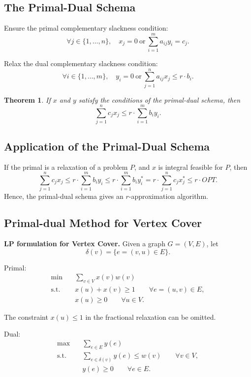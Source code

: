 \documentclass[12pt,a4paper]{report}
\newtheorem{theorem}{Theorem}
\begin{document}
\subsection{The Primal-Dual Schema}

Ensure the primal complementary slackness condition:
\[
\forall j \in \{1,\dots,n\}, \quad x_j = 0 \ \text{or} \ \sum_{i=1}^m a_{ij}y_i = c_j.
\]

Relax the dual complementary slackness condition:
\[
\forall i \in \{1,\dots,m\}, \quad y_i = 0 \ \text{or} \ \sum_{j=1}^n a_{ij}x_j \le r \cdot b_i.
\]

\begin{theorem}
If $x$ and $y$ satisfy the conditions of the primal-dual schema, then
\[
\sum_{j=1}^n c_j x_j \le r \cdot \sum_{i=1}^m b_i y_i.
\]
\end{theorem}

\subsection{Application of the Primal-Dual Schema}

If the primal is a relaxation of a problem $P$, and $x$ is integral feasible for $P$, then
\[
\sum_{j=1}^n c_j x_j \le r \cdot \sum_{i=1}^m b_i y_i
\le r \cdot \sum_{i=1}^m b_i y_i^*
= r \cdot \sum_{j=1}^n c_j x_j^*
\le r \cdot OPT.
\]
Hence, the primal-dual schema gives an $r$-approximation algorithm.

\subsection{Primal-dual Method for Vertex Cover}

\textbf{LP formulation for Vertex Cover.} Given a graph $G=(V,E)$, let
\[
\delta(v)=\{e=(v,u)\in E\}.
\]

Primal:
\[
\begin{aligned}
\min \quad & \sum_{v\in V} x(v)w(v) \\
\text{s.t.} \quad & x(u)+x(v)\ge 1 \qquad \forall e=(u,v)\in E, \\
& x(u)\ge 0 \qquad \forall u\in V.
\end{aligned}
\]

The constraint $x(u)\le 1$ in the fractional relaxation can be omitted.

Dual:
\[
\begin{aligned}
\max \quad & \sum_{e\in E} y(e) \\
\text{s.t.} \quad & \sum_{e\in \delta(v)} y(e)\le w(v) \qquad \forall v\in V, \\
& y(e)\ge 0 \qquad \forall e\in E.
\end{aligned}
\]
\end{document}
